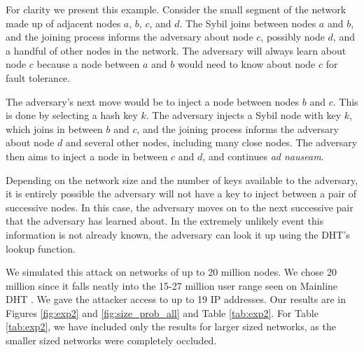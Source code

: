 \documentclass[11pt,conference]{IEEEtran}
\begin{document}
For clarity we present this example. 
Consider the small segment of the network made up of adjacent nodes $a$, $b$, $c$, and $d$.
The Sybil joins between nodes $a$ and $b$, and the joining process informs the adversary about node $c$, possibly node $d$, and a handful of other nodes in the network.
The adversary will always learn about node $c$ because a node between $a$ and $b$ would need to know about node $c$ for fault tolerance.

The adversary's next move would be to inject a node between nodes $b$ and $c$.
This is done by selecting a hash key $k$.
The adversary injects a Sybil node with key $k$, which joins in between $b$ and $c$, and the joining process informs the adversary about node $d$ and several other nodes, including many close nodes.
The adversary then aims to inject a node in between $c$ and $d$, and continues \textit{ad nauseam}.  %

Depending on the network size and the number of keys available to the adversary, it is entirely possible the adversary will not have a key to inject between a pair of successive nodes.
In this case, the adversary moves on to the next successive pair that the adversary has learned about.
In the extremely unlikely event this information is not already known, the adversary can look it up using the DHT's lookup function.

We simulated this attack on networks of up to 20 million nodes.
We chose 20 million since it falls neatly into the 15-27 million user range seen on Mainline DHT \cite{mainlineMeasure}.
We gave the attacker access to up to 19 IP addresses.
Our results are in Figures \ref{fig:exp2} and \ref{fig:size_prob_all} and Table \ref{tab:exp2}.
For Table \ref{tab:exp2}, we have included only the results for larger sized networks, as the smaller sized networks were completely occluded.
\end{document}
